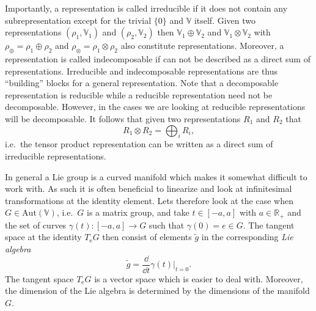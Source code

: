 Importantly, a representation is called irreducible if it does not contain any subrepresentation except for the trivial $\{0\}$ and $\mathbb{V}$ itself. Given two representations $(\rho_1,\mathbb{V}_1)$ and $(\rho_2,\mathbb{V}_2)$ then $\mathbb{V}_1\oplus\mathbb{V}_2$ and $\mathbb{V}_1\otimes\mathbb{V}_2$ with $\rho_\oplus = \rho_1\oplus\rho_2$ and $\rho_\otimes = \rho_1\otimes\rho_2$ also constitute representations. Moreover, a representation is called indecomposable if can not be described as a direct sum of representations. Irreducible and indecomposable representations are thus ``building'' blocks for a general representation. Note that a decomposable representation is reducible while a reducible representation need not be decomposable. However, in the cases we are looking at reducible representations will be decomposable. It follows that given two representations $R_1$ and $R_2$ that 
\begin{equation}
    R_1\otimes R_2 = \bigoplus_i R_i,
\end{equation}
i.e.\ the tensor product representation can be written as a direct sum of irreducible representations.


In general a Lie group is a curved manifold which makes it somewhat difficult to work with. As such it is often beneficial to linearize and look at infinitesimal transformations at the identity element. Lets therefore look at the case when $G\in \text{Aut}(\mathbb{V})$, i.e.\ $G$ is a matrix group, and take $t\in [-a,a]$ with $a\in\mathbb{R_+}$ and the set of curves $\gamma(t): [-a,a]\to G$ such that $\gamma(0)= e\in G$. The tangent space at the identity $T_\mathrm{e}G$ then consist of elements $\tilde{g}$ in the corresponding \emph{Lie algebra}
\begin{equation}
\tilde{g} = \frac{\dd}{\dd t}\gamma(t)|_{t=0}.
\end{equation}
The tangent space $T_\mathrm{e}G$ is a vector space which is easier to deal with. Moreover, the dimension of the Lie algebra is determined by the dimensions of the manifold $G$.

